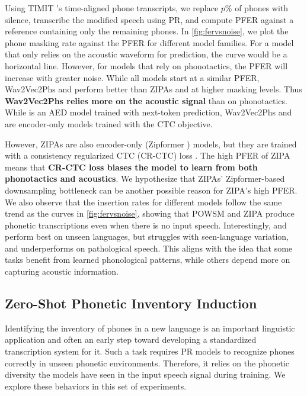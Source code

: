 Using TIMIT \cite{garofolo1993timit}'s time-aligned phone transcripts, we replace $p\%$ of phones with silence, transcribe the modified speech using PR, and compute PFER against a reference containing only the remaining phones.
In \autoref{fig:fervsnoise}, we plot the phone masking rate against the PFER for different model families.
For a model that only relies on the acoustic waveform for prediction, the curve would be a horizontal line.
However, for models that rely on phonotactics, the PFER will increase with greater noise.
While all models start at a similar PFER, Wav2Vec2Phs and \powsmctc perform better than ZIPAs and \powsm at higher masking levels. Thus  \textbf{Wav2Vec2Phs relies more on the acoustic signal} than on phonotactics.
While \powsm is an AED model trained with next-token prediction, Wav2Vec2Phs and \powsmctc are encoder-only models trained with the CTC objective.

However, ZIPAs are also encoder-only (Zipformer \cite{yao2023zipformer})  models, but they are trained with a consistency regularized CTC (CR-CTC) loss \cite{crctc}.
The high PFER of ZIPA  means that \textbf{CR-CTC loss biases the model to learn from both phonotactics and acoustics}.
We hypothesize that ZIPAs' Zipformer-based downsampling bottleneck can be another possible reason for ZIPA's high PFER.
We also observe that the insertion rates for different models follow the same trend as the curves in \autoref{fig:fervsnoise}, showing that POWSM and ZIPA produce phonetic transcriptions even when there is no input speech.
Interestingly, \zipactcns and \powsm perform best on unseen languages, but \powsm struggles with seen-language variation, and \zipactcns underperforms on pathological speech. This aligns with the idea that some tasks benefit from learned phonological patterns, while others depend more on capturing acoustic information.


\subsection{Zero-Shot Phonetic Inventory Induction}
\label{sec:analysis_phoneinv}
Identifying the inventory of phones in a new language is an important linguistic application and often an early step toward developing a standardized transcription system for it.
Such a task requires PR models to recognize phones correctly in unseen phonetic environments.
Therefore, it relies on the phonetic diversity the models have seen in the input speech signal during training.
We explore these behaviors in this set of experiments.

